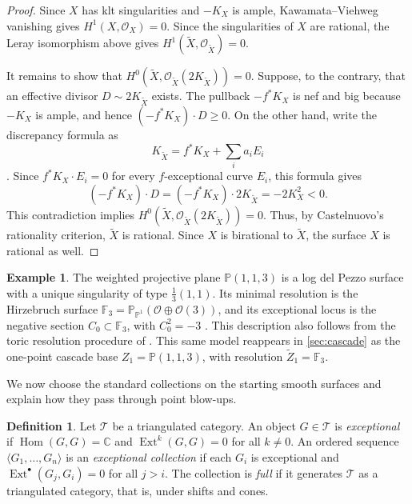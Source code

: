 \documentclass[11pt]{article}
\theoremstyle{plain}
\theoremstyle{definition}
\newtheorem{definition}[definition]{Definition}
\newtheorem{example}[example]{Example}
\theoremstyle{remark}
\newcommand{\Pp}{\mathbb P}
\newcommand{\F}{\mathbb F}
\newcommand{\C}{\mathbb C}
\newcommand{\Hom}{\operatorname{Hom}}
\newcommand{\Ext}{\operatorname{Ext}}
\newcommand{\OO}{\mathcal O}
\begin{document}
\begin{proof}
Since \(X\) has klt singularities and \(-K_X\) is ample, Kawamata--Viehweg vanishing gives \(H^1(X,\OO_X)=0\). Since the singularities of \(X\) are rational, the Leray isomorphism above gives \(H^1(\widetilde X,\OO_{\widetilde X})=0\).

It remains to show that \(H^0(\widetilde X,\OO_{\widetilde X}(2K_{\widetilde X}))=0\). Suppose, to the contrary, that an effective divisor \(D\sim 2K_{\widetilde X}\) exists. The pullback \(-f^*K_X\) is nef and big because \(-K_X\) is ample, and hence \((-f^*K_X)\cdot D\geq 0\). On the other hand, write the discrepancy formula as
\[
K_{\widetilde X}=f^*K_X+\sum_i a_iE_i
\].
Since \(f^*K_X\cdot E_i=0\) for every \(f\)-exceptional curve \(E_i\), this formula gives
\[
(-f^*K_X)\cdot D
=
(-f^*K_X)\cdot 2K_{\widetilde X}
=
-2K_X^2<0.
\]
This contradiction implies \(H^0(\widetilde X,\OO_{\widetilde X}(2K_{\widetilde X}))=0\). Thus, by Castelnuovo's rationality criterion, \(\widetilde X\) is rational. Since \(X\) is birational to \(\widetilde X\), the surface \(X\) is rational as well.
\end{proof}

\begin{example}
The weighted projective plane \(\Pp(1,1,3)\) is a log del Pezzo surface with a unique singularity of type \(\frac13(1,1)\). Its minimal resolution is the Hirzebruch surface \(\F_3=\Pp_{\Pp^1}(\OO\oplus\OO(3))\), and its exceptional locus is the negative section \(C_0\subset \F_3\), with \(C_0^2=-3\) \cite[Example~3.17]{KKS2020}. This description also follows from the toric resolution procedure of \cite[Chapters~10--11]{CoxLittleSchenck2011}.
This same model reappears in \cref{sec:cascade} as the one-point cascade
base \(Z_1=\Pp(1,1,3)\), with resolution \(\widetilde Z_1=\F_3\).
\end{example}

We now choose the standard collections on the starting smooth surfaces
and explain how they pass through point blow-ups.

\begin{definition}
Let \(\mathcal T\) be a triangulated category. An object \(G\in\mathcal T\) is \emph{exceptional} if \(\Hom(G,G)=\C\) and \(\Ext^k(G,G)=0\) for all \(k\neq 0\). An ordered sequence \(\langle G_1,\dots,G_n\rangle\) is an \emph{exceptional collection} if each \(G_i\) is exceptional and \(\Ext^\bullet(G_j,G_i)=0\) for all \(j>i\). The collection is \emph{full} if it generates \(\mathcal T\) as a triangulated category, that is, under shifts and cones.
\end{definition}
\end{document}
